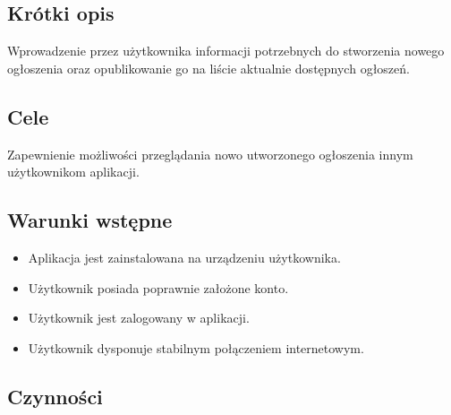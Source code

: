 \documentclass[licencjacka]{pracamgr}
\begin{document}
    \subsection{Krótki opis}
    Wprowadzenie przez użytkownika informacji potrzebnych do stworzenia nowego ogłoszenia oraz opublikowanie go na liście aktualnie dostępnych
    ogłoszeń.
    \subsection{Cele}
    Zapewnienie możliwości przeglądania nowo utworzonego ogłoszenia innym użytkownikom aplikacji.
    \subsection{Warunki wstępne}
    \begin{itemize}
        \item Aplikacja jest zainstalowana na urządzeniu użytkownika.
        \item Użytkownik posiada poprawnie założone konto.
        \item Użytkownik jest zalogowany w aplikacji.
        \item Użytkownik dysponuje stabilnym połączeniem internetowym.
    \end{itemize}
    \subsection{Czynności}
\end{document}
